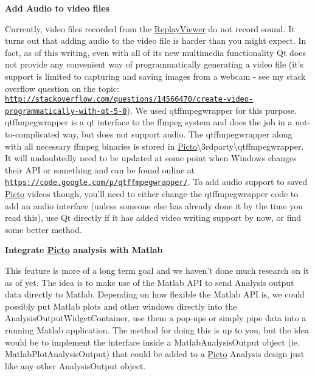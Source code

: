 {\bfseries Add Audio to video files}\par
 Currently, video files recorded from the \hyperlink{class_replay_viewer}{Replay\-Viewer} do not record sound. It turns out that adding audio to the video file is harder than you might expect. In fact, as of this writing, even with all of its new multimedia functionality Qt does not provide any convenient way of programmatically generating a video file (it's support is limited to capturing and saving images from a webcam -\/ see my stack overflow question on the topic\-: \href{http://stackoverflow.com/questions/14566470/create-video-programmatically-with-qt-5-0}{\tt http\-://stackoverflow.\-com/questions/14566470/create-\/video-\/programmatically-\/with-\/qt-\/5-\/0}). We used qtffmpegwrapper for this purpose. qtffmpegwrapper is a qt interface to the ffmpeg system and does the job in a not-\/to-\/complicated way, but does not support audio. The qtffmpegwrapper along with all necessary ffmpeg binaries is stored in \hyperlink{namespace_picto}{Picto}\textbackslash{}3rdparty\textbackslash{}qtffmpegwrapper. It will undoubtedly need to be updated at some point when Windows changes their A\-P\-I or something and can be found online at \href{https://code.google.com/p/qtffmpegwrapper/}{\tt https\-://code.\-google.\-com/p/qtffmpegwrapper/}. To add audio support to saved \hyperlink{namespace_picto}{Picto} videos though, you'll need to either change the qtffmpegwrapper code to add an audio interface (unless someone else has already done it by the time you read this), use Qt directly if it has added video writing support by now, or find some better method.

{\bfseries Integrate \hyperlink{namespace_picto}{Picto} analysis with Matlab}\par
 This feature is more of a long term goal and we haven't done much research on it as of yet. The idea is to make use of the Matlab A\-P\-I to send Analysis output data directly to Matlab. Depending on how flexible the Matlab A\-P\-I is, we could possibly put Matlab plots and other windows directly into the Analysis\-Output\-Widget\-Container, use them a pop-\/ups or simply pipe data into a running Matlab application. The method for doing this is up to you, but the idea would be to implement the interface inside a Matlab\-Analysis\-Output object (ie. Matlab\-Plot\-Analysis\-Output) that could be added to a \hyperlink{namespace_picto}{Picto} Analysis design just like any other Analysis\-Output object.

